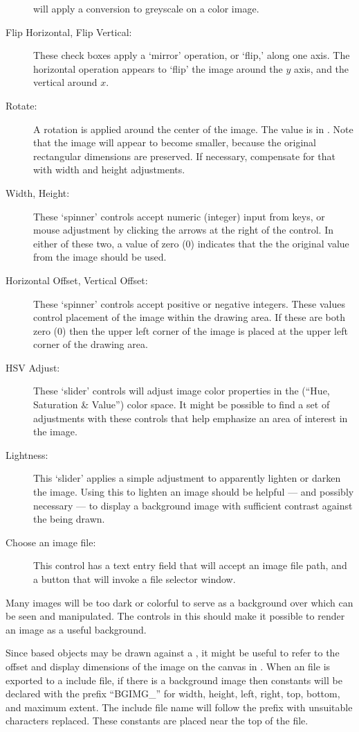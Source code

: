 \begin{description}
		  will apply a conversion to greyscale on a color
		  image.
		  \item[Flip Horizontal, Flip Vertical:] These check boxes
		  apply a `mirror' operation, or `flip,' along one
		  axis. The horizontal operation appears to `flip'
		  the image around the $y$ axis,
		  and the vertical around $x$.
		  \item[Rotate:] A rotation is applied around the
		  center of the image. The value is in .
		  Note that the image will appear to become smaller,
		  because the original rectangular dimensions
		  are preserved. If necessary, compensate for that
		  with width and height adjustments.
		  \item[Width, Height:] These `spinner' controls accept
		  numeric (integer) input from keys, or mouse adjustment
		  by clicking the arrows at the right of the control.
		  In either of these two, a value of zero (0)
		  indicates that the the original value from the image
		  should be used.
		  \item[Horizontal Offset, Vertical Offset:] These
		  `spinner' controls accept positive or negative
		  integers. These values control placement of the image
		  within the drawing area. If these are both
		  zero (0) then the upper left corner of the image
		  is placed at the upper left corner of the drawing
		  area.
		  \item[HSV Adjust:] These `slider' controls will
		  adjust image color properties in the
		  (``Hue, Saturation \& Value'') color space.
		  It might be possible to find a set of adjustments
		  with these controls that help emphasize an area
		  of interest in the image.
		  \item[Lightness:] This `slider' applies a simple
		  adjustment to apparently lighten or darken the
		  image. Using this to lighten an image should be
		  helpful --- and possibly necessary --- to display
		  a background image with sufficient contrast
		  against the  being drawn.
		  \item[Choose an image file:] This control has a
		  text entry field that will accept an image
		  file path, and a button that will invoke a
		  file selector  window.
		\end{description}

		Many images will be too dark or colorful to serve
		as a background over which  can be
		seen and manipulated. The controls in this 
		should make it possible to render an image as a
		useful background.

		Since  based objects may be drawn against a
		, it might be useful to refer to the
		offset and display dimensions of the image on the canvas
		in \IXpov{} . When an \IXpkg{} file is exported to
		a \IXpov{} include file, if there is a background image
		then constants will be declared with the prefix
		``BGIMG\_'' for width, height, left, right,
		top, bottom, and maximum extent. The include file
		name will follow the prefix with unsuitable characters
		replaced. These constants are placed near the top
		of the file.
